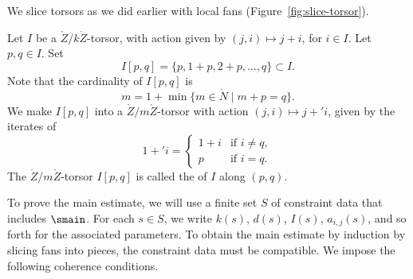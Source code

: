 We slice torsors as we did earlier with local fans (Figure~\ref{fig:slice-torsor}).



\begin{definition}[slice] 
Let $I$ be a $\ring{Z}/k\ring{Z}$-torsor, with action given by $(j,i)\mapsto j+i$,
for $i\in I$.  Let $p,q\in I$.  Set
\[
I[p,q] = \{p,1+p,2+p,\ldots,q\} \subset I.
\]
Note that the cardinality of $I[p,q]$ is
\[
m = 1 + \min \{m\in \ring{N} \mid m + p = q\}.
\]
We make $I[p,q]$ into a $\ring{Z}/m\ring{Z}$-torsor with action $(j,i)\mapsto j+' i$,
given by the iterates of
\[
1 +' i = 
\begin{cases}
  1 + i &\text{if } i\ne q,\\
  p &\text{if } i = q.
\end{cases}
\]
The $\ring{Z}/m\ring{Z}$-torsor $I[p,q]$ is called the
 of $I$ along $(p,q)$.
\end{definition}

\figWKUYEXM %

To prove the main estimate, we will use a finite set $S$ of constraint
data that includes $\smain$.  
For each $s\in S$, we write $k(s)$,
$d(s)$, $I(s)$, $a_{i,j}(s)$, and so forth for the associated parameters. 
To obtain the main estimate by induction by slicing fans
into pieces, the constraint data must be compatible. We impose the
following coherence conditions.   

